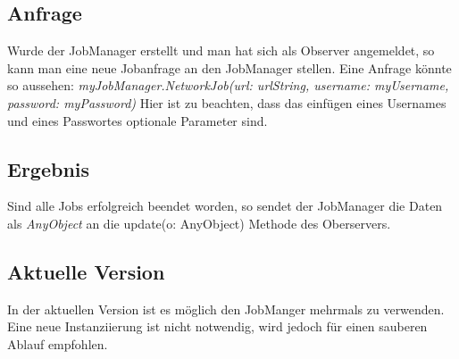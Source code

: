 \documentclass[a4paper, 12pt]{article}
\begin{document}
\subsection{Anfrage}
Wurde der JobManager erstellt und man hat sich als Observer angemeldet, so kann man eine neue Jobanfrage an den JobManager stellen. Eine Anfrage könnte so aussehen:
\newline
\newline \textit{myJobManager.NetworkJob(url: urlString, username: myUsername, password: myPassword)}
\newline
\newline Hier ist zu beachten, dass das einfügen eines Usernames und eines Passwortes optionale Parameter sind. 

\subsection{Ergebnis}
Sind alle Jobs erfolgreich beendet worden, so sendet der JobManager die Daten als \textit{AnyObject} an die update(o: AnyObject) Methode des Oberservers. 
\newline
\subsection{Aktuelle Version}
In der aktuellen Version ist es möglich den JobManger mehrmals zu verwenden. Eine neue Instanziierung ist nicht notwendig, wird jedoch für einen sauberen Ablauf empfohlen.

\newpage
\end{document}
